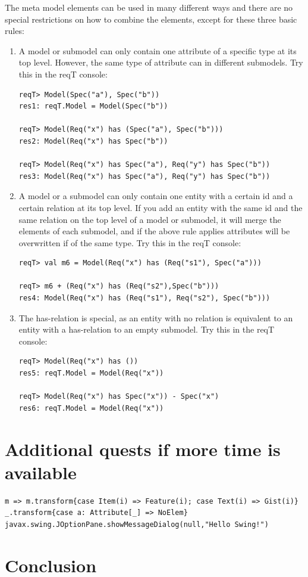 \documentclass[11pt]{article}
\begin{document}
The meta model elements can be used in many different ways and there are no special restrictions on how to combine the elements, except for these three basic rules:
\begin{enumerate}
\item A model or submodel can only contain one attribute of a specific type at its top level. However, the same type of attribute can in different submodels. Try this in the reqT console:
{\footnotesize\begin{verbatim}
reqT> Model(Spec("a"), Spec("b"))
res1: reqT.Model = Model(Spec("b"))

reqT> Model(Req("x") has (Spec("a"), Spec("b")))
res2: Model(Req("x") has Spec("b"))

reqT> Model(Req("x") has Spec("a"), Req("y") has Spec("b"))
res3: Model(Req("x") has Spec("a"), Req("y") has Spec("b"))
\end{verbatim}}
\item A model or a submodel can only contain one entity with a certain id and a certain relation at its top level. If you add an entity with the same id and the same relation on the top level of a model or submodel, it will merge the elements of each submodel, and if the above rule applies attributes will be overwritten if of the same type. Try this in the reqT console:
{\footnotesize\begin{verbatim}
reqT> val m6 = Model(Req("x") has (Req("s1"), Spec("a"))) 

reqT> m6 + (Req("x") has (Req("s2"),Spec("b")))
res4: Model(Req("x") has (Req("s1"), Req("s2"), Spec("b")))
\end{verbatim}}

\item The has-relation is special, as an entity with no relation is equivalent to an entity with a has-relation to an empty submodel. Try this in the reqT console:
{\footnotesize\begin{verbatim}
reqT> Model(Req("x") has ())
res5: reqT.Model = Model(Req("x"))

reqT> Model(Req("x") has Spec("x")) - Spec("x")
res6: reqT.Model = Model(Req("x"))
\end{verbatim}}

\end{enumerate}

\section{Additional quests if more time is available}

{\footnotesize\begin{verbatim}
m => m.transform{case Item(i) => Feature(i); case Text(i) => Gist(i)}
_.transform{case a: Attribute[_] => NoElem}
javax.swing.JOptionPane.showMessageDialog(null,"Hello Swing!")
\end{verbatim}}

\section{Conclusion}
\end{document}
